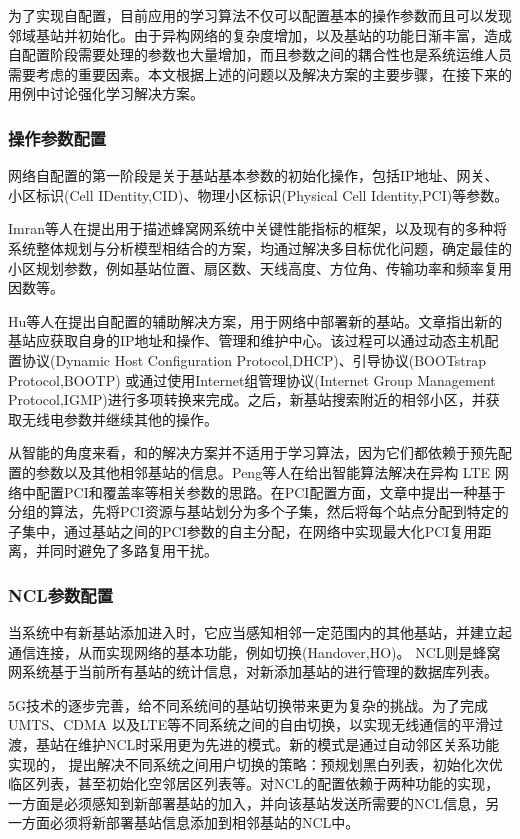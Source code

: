 \documentclass{IEEEtran}
\begin{document}
为了实现自配置，目前应用的学习算法不仅可以配置基本的操作参数而且可以发现邻域基站并初始化。由于异构网络的复杂度增加，以及基站的功能日渐丰富，造成自配置阶段需要处理的参数也大量增加，而且参数之间的耦合性也是系统运维人员需要考虑的重要因素。本文根据上述的问题以及解决方案的主要步骤，在接下来的用例中讨论强化学习解决方案。


\subsubsection{操作参数配置}

网络自配置的第一阶段是关于基站基本参数的初始化操作，包括IP地址、网关、小区标识(Cell IDentity,CID)、物理小区标识(Physical Cell Identity,PCI)等参数。

Imran等人在\cite{Imran2013a}提出用于描述蜂窝网系统中关键性能指标的框架，以及现有的多种将系统整体规划与分析模型相结合的方案，均通过解决多目标优化问题，确定最佳的小区规划参数，例如基站位置、扇区数、天线高度、方位角、传输功率和频率复用因数等。

Hu等人在\cite{Hu2010}提出自配置的辅助解决方案，用于网络中部署新的基站。文章指出新的基站应获取自身的IP地址和操作、管理和维护中心。该过程可以通过动态主机配置协议(Dynamic Host Configuration Protocol,DHCP)、引导协议(BOOTstrap Protocol,BOOTP) 或通过使用Internet组管理协议(Internet Group Management Protocol,IGMP)进行多项转换来完成。之后，新基站搜索附近的相邻小区，并获取无线电参数并继续其他的操作。

从智能的角度来看，\cite{Wainio2016}和\cite{Hu2010}的解决方案并不适用于学习算法，因为它们都依赖于预先配置的参数以及其他相邻基站的信息。Peng等人在\cite{Peng2013}给出智能算法解决在异构 LTE 网络中配置PCI和覆盖率等相关参数的思路。在PCI配置方面，文章中提出一种基于分组的算法，先将PCI资源与基站划分为多个子集，然后将每个站点分配到特定的子集中，通过基站之间的PCI参数的自主分配，在网络中实现最大化PCI复用距离，并同时避免了多路复用干扰。

\subsubsection{NCL参数配置}

当系统中有新基站添加进入时，它应当感知相邻一定范围内的其他基站，并建立起通信连接，从而实现网络的基本功能，例如切换(Handover,HO)。 NCL则是蜂窝网系统基于当前所有基站的统计信息，对新添加基站的进行管理的数据库列表。

5G技术的逐步完善，给不同系统间的基站切换带来更为复杂的挑战。为了完成UMTS、CDMA 以及LTE等不同系统之间的自由切换，以实现无线通信的平滑过渡，基站在维护NCL时采用更为先进的模式。新的模式是通过自动邻区关系功能实现的，\cite{3gpp.32.511} 提出解决不同系统之间用户切换的策略：预规划黑白列表，初始化次优临区列表，甚至初始化空邻居区列表等。对NCL的配置依赖于两种功能的实现，一方面是必须感知到新部署基站的加入，并向该基站发送所需要的NCL信息，另一方面必须将新部署基站信息添加到相邻基站的NCL中。
\end{document}
